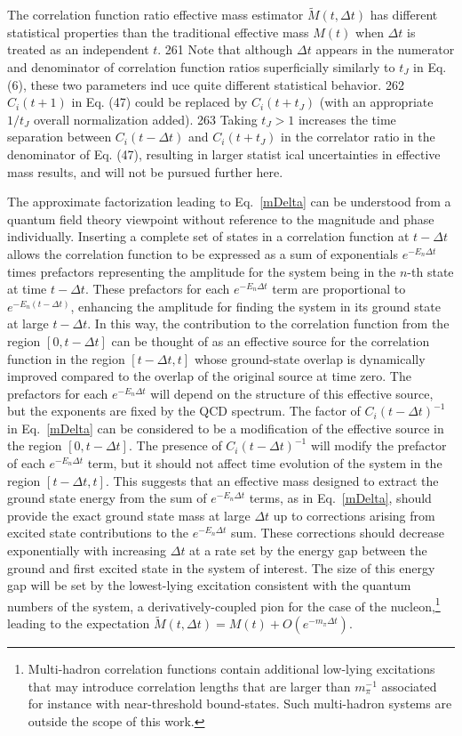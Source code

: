 %
The correlation function ratio effective mass estimator $\tilde{M}(t,\Delta t)$ has different statistical properties than the traditional effective mass $M(t)$ when $\Delta t$ is treated as an independent  $t$.
261 Note that although $\Delta t$ appears in the numerator and denominator of correlation function ratios superficially similarly to $t_J$ in Eq. (6), these two parameters ind    uce quite different statistical behavior.
262 $C_i(t+1)$ in Eq. (47) could be replaced by $C_i(t+t_J)$ (with an appropriate $1/t_J$ overall normalization added).
263 Taking $t_J>1$ increases the time separation between $C_i(t-\Delta t)$ and $C_i(t+t_J)$ in the correlator ratio in the denominator of Eq. (47), resulting in larger statist    ical uncertainties in effective mass results, and will not be pursued further here.

  The approximate factorization leading to Eq.~\eqref{mDelta} can be understood from a quantum field theory viewpoint without reference to the magnitude and phase individually.
  Inserting a complete set of states in a correlation function at $t-\Delta t$ allows the correlation function to be expressed as a sum of exponentials $e^{-E_n \Delta t}$ times prefactors representing the amplitude for the system being in the $n$-th state at time $t-\Delta t$.
  These prefactors for each $e^{-E_n \Delta t}$ term are proportional to $e^{-E_n(t-\Delta t)}$, enhancing the amplitude for finding the system in its ground state at large $t-\Delta t$.
  In this way, the contribution to the correlation function from the region $[0,t-\Delta t]$ can be thought of as an effective source for the correlation function in the region $[t-\Delta t, t]$ whose ground-state overlap is dynamically improved compared to the overlap of the original source at time zero.
  The prefactors for each $e^{-E_n \Delta t}$ will depend on the structure of this effective source, but the exponents are fixed by the QCD spectrum.
  The factor of $C_i(t-\Delta t)^{-1}$ in Eq.~\eqref{mDelta} can be considered to be a modification of the effective source in the region $[0,t-\Delta t]$.
  The presence of $C_i(t-\Delta t)^{-1}$ will modify the prefactor of each $e^{-E_n \Delta t}$ term, but it should not affect time evolution of the system in the region $[t-\Delta t, t]$.
  This suggests that an effective mass designed to extract the ground state energy from the sum of $e^{-E_n \Delta t}$ terms, as in Eq.~\eqref{mDelta}, should provide the exact ground state mass at large $\Delta t$ up to corrections arising from excited state contributions to the $e^{-E_n \Delta t}$ sum.
  These corrections should decrease exponentially with increasing $\Delta t$ at a rate set by the energy gap between the ground and first excited state in the system of interest.
  The size of this energy gap will be set by the lowest-lying excitation consistent with the quantum numbers of the system, a derivatively-coupled pion for the case of the nucleon,\footnote{  Multi-hadron correlation functions contain additional low-lying excitations that may introduce correlation lengths that are larger than $m_\pi^{-1}$ associated for instance with near-threshold bound-states. Such multi-hadron systems are outside the scope of this work.}
  leading to the expectation $\tilde{M}(t, \Delta t) = M(t) + O(e^{-m_\pi \Delta t})$.

